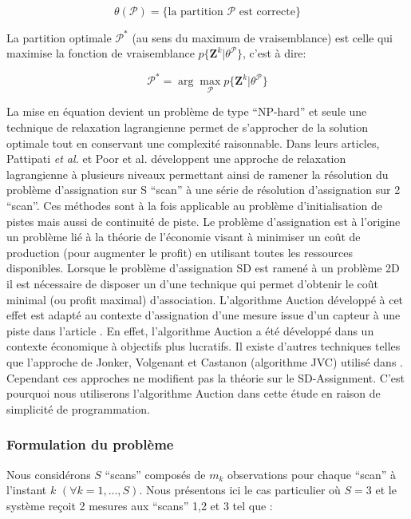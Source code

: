 \documentclass[10pt,french,a4paper]{report}
\begin{document}
\begin{equation}
\theta(\mathcal{P}) = \{ \text{la partition $\mathcal{P}$ est correcte}\}
\end{equation}

La partition optimale $\mathcal{P}^*$ (au sens du
maximum de vraisemblance) est celle qui maximise la fonction de vraisemblance $p\{\mathbf{Z}^{k}|\theta^{\mathcal{P}} \}$, c'est à dire:


\begin{equation}
\mathcal{P}^* = \arg\max_{\mathcal{P}} p\{\mathbf{Z}^{k}|\theta^{\mathcal{P}} \}
\end{equation}
 
La mise en équation devient un problème de type ``NP-hard'' et seule une technique de relaxation lagrangienne permet de s'approcher de la solution optimale tout en
conservant une complexité raisonnable.
Dans leurs articles, Pattipati \textit{et al.} \cite{Pattipati1992} et Poor et al. \cite{Poore1995} développent une approche de
relaxation lagrangienne à plusieurs niveaux permettant ainsi de ramener la résolution du problème
d’assignation sur S ``scan'' à une série de résolution d’assignation sur 2 ``scan''. Ces méthodes sont à la fois
applicable au problème d'initialisation de pistes mais aussi de continuité de piste.
Le problème d'assignation est à l'origine un problème lié à la théorie de l'économie visant à minimiser un coût
de production (pour augmenter le profit) en utilisant toutes les ressources disponibles. Lorsque le problème
d'assignation SD est ramené à un problème 2D il est nécessaire de disposer un d'une technique qui permet
d'obtenir le coût minimal (ou profit maximal) d'association. L'algorithme Auction développé à cet effet est adapté
au contexte d'assignation d'une mesure issue d'un capteur à une piste dans l'article \cite{Pattipati1992}. En effet,
l'algorithme Auction a été développé dans un contexte économique à objectifs plus lucratifs. Il existe d'autres
techniques telles que l'approche de Jonker, Volgenant et Castanon (algorithme JVC) utilisé dans \cite{Jonker1987}. Cependant ces approches ne modifient pas la théorie sur le
SD-Assignment. C'est pourquoi nous utiliserons l'algorithme Auction dans cette étude en raison de simplicité de
programmation.


\subsubsection{Formulation du problème}
Nous considérons $S$ ``scans'' composés de $m_k$ observations pour chaque ``scan'' à l'instant $k$ $(\forall k = {1,..., S})$. Nous
présentons ici le cas particulier où $S = 3$ et le système reçoit 2 mesures aux ``scans'' 1,2 et 3  tel que :
\end{document}
